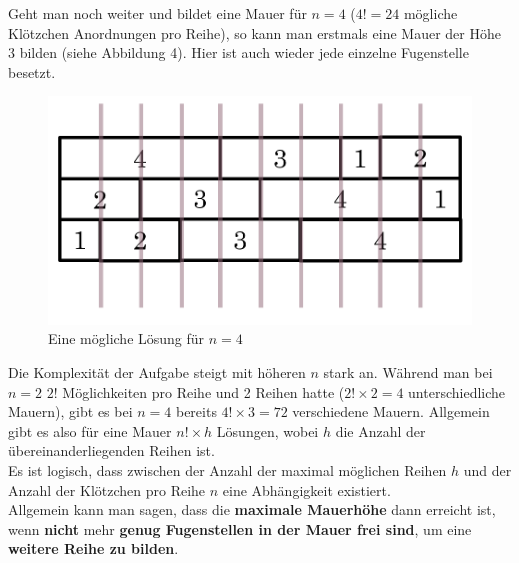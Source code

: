 \documentclass[a4paper,12pt]{article}
\begin{document}
Geht man noch weiter und bildet eine Mauer für $n = 4$ ($4! = 24$ mögliche Klötzchen Anordnungen pro Reihe), so kann man erstmals eine Mauer der Höhe 3 bilden (siehe Abbildung 4). Hier ist auch wieder jede einzelne Fugenstelle besetzt.
\begin{figure}[H]
    \centering
    \includegraphics[width=0.7\linewidth]{Bilder/Aufgabe1/Loesung_N4.png}
    \caption{Eine mögliche Lösung für $n = 4$}
\end{figure}

Die Komplexität der Aufgabe steigt mit höheren $n$ stark an. Während man bei $n = 2$ $2!$ Möglichkeiten pro Reihe und 2 Reihen hatte ($2!\times2 = 4$ unterschiedliche Mauern), gibt es bei $n = 4$ bereits $4!\times3 = 72$ verschiedene Mauern.
Allgemein gibt es also für eine Mauer $n!\times h$ Lösungen, wobei $h$ die Anzahl der übereinanderliegenden Reihen ist.
\\[0.4cm]
Es ist logisch, dass zwischen der Anzahl der maximal möglichen Reihen $h$ und der Anzahl der Klötzchen pro Reihe $n$ eine Abhängigkeit existiert.
\\[0.4cm]
Allgemein kann man sagen, dass die \textbf{maximale Mauerhöhe} dann erreicht ist, wenn \textbf{nicht} mehr \textbf{genug Fugenstellen in der Mauer frei sind}, um eine \textbf{weitere Reihe zu bilden}.
\end{document}

